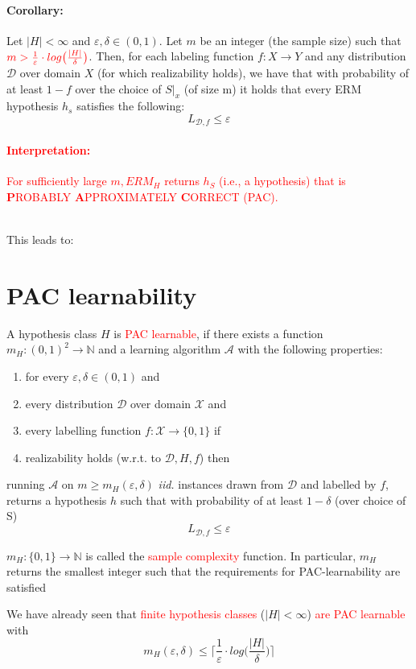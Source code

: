 \documentclass[10pt,a4paper]{article}
\theoremstyle{definition}
\theoremstyle{plain}
\begin{document}
\paragraph{Corollary:} Let $|H| < \infty$ and $\varepsilon, \delta \in (0,1)$. Let $m$ be an integer (the sample size) such that $\color{red} m>\frac{1}{\varepsilon} \cdot log \big(\frac{|H|}{\delta}\big)$. Then, for each labeling function $f: X \to Y$ and any distribution $\mathcal{D}$ over domain $X$ (for which realizability holds), we have that with probability of at least $1-f$ over the choice of $S|_x$ (of size m) it holds that every ERM hypothesis $h_s$ satisfies the following:
$$ L_{\mathcal{D},f} \leq \varepsilon $$

\textcolor{red}{\paragraph{Interpretation:} For sufficiently large $m, ERM_H$ returns $h_S$ (i.e., a hypothesis) that is \textbf{P}ROBABLY \textbf{A}PPROXIMATELY \textbf{C}ORRECT (PAC).}\\
\newline
This leads to:
\section*{PAC learnability}
\begin{boxeddef}
	A hypothesis class $H$ is \textcolor{red}{PAC learnable}, if there exists a function $m_H: (0,1)^2 \to \mathbb{N}$ and a learning algorithm $\mathcal{A}$ with the following properties:
	\begin{enumerate}
		\item for every $\varepsilon, \delta \in (0,1)$ and
		\item every distribution $\mathcal{D}$ over domain $\mathcal{X}$ and
		\item every labelling function $f: \mathcal{X} \to \{0, 1\}$ if
		\item realizability holds (w.r.t. to $\mathcal{D}, H, f$) then
	\end{enumerate}
	running $\mathcal{A}$ on $m \geq m_H(\varepsilon, \delta)$ \textit{iid.} instances drawn from $\mathcal{D}$ and labelled by $f$, returns a hypothesis $h$ such that with probability of at least $1-\delta$ (over choice of S) 
	$$ L_{\mathcal{D}, f} \leq \varepsilon $$
\end{boxeddef}
\begin{boxedsubdef}
	$m_H: \{0,1\} \to \mathbb{N}$ is called the \textcolor{red}{sample complexity} function. In particular, $m_H$ returns the smallest integer such that the requirements for PAC-learnability are satisfied
\end{boxedsubdef}
We have already seen that \textcolor{red}{finite hypothesis classes} ($|H| < \infty$) \textcolor{red}{are PAC learnable} with 
$$ m_H(\varepsilon, \delta) \leq \bigg\lceil\frac{1}{\varepsilon} \cdot log \bigg( \frac{|H|}{\delta}\bigg) \bigg\rceil $$
\end{document}
